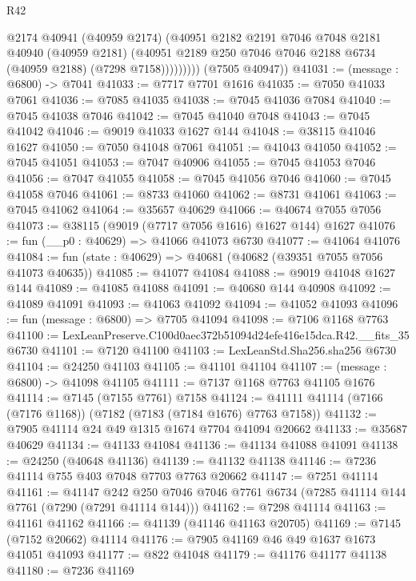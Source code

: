 \begin{lexlean}{R42}
\begin{coremodule}
{                  @2174
                  @40941
                  (@40959 @2174)
                  (@40951
                    @2182
                    @2191
                    @7046
                    @7048
                    @2181
                    @40940
                    (@40959 @2181)
                    (@40951 @2189 @250 @7046 @7046 @2188 @6734 (@40959 @2188) (@7298 @7158)))))))))
      (@7505 @40947))
@41031 := (message : @6800) -> @7041
@41033 := @7717 @7701 @1616
@41035 := @7050 @41033 @7061
@41036 := @7085 @41035
@41038 := @7045 @41036 @7084
@41040 := @7045 @41038 @7046
@41042 := @7045 @41040 @7048
@41043 := @7045 @41042
@41046 := @9019 @41033 @1627 @144
@41048 := @38115 @41046 @1627
@41050 := @7050 @41048 @7061
@41051 := @41043 @41050
@41052 := @7045 @41051
@41053 := @7047 @40906
@41055 := @7045 @41053 @7046
@41056 := @7047 @41055
@41058 := @7045 @41056 @7046
@41060 := @7045 @41058 @7046
@41061 := @8733 @41060
@41062 := @8731 @41061
@41063 := @7045 @41062
@41064 := @35657 @40629
@41066 := @40674 @7055 @7056
@41073 := @38115 (@9019 (@7717 @7056 @1616) @1627 @144) @1627
@41076 := fun (__p0 : @40629) => @41066 @41073 @6730
@41077 := @41064 @41076
@41084 := fun (state : @40629) => @40681 (@40682 (@39351 @7055 @7056 @41073 @40635))
@41085 := @41077 @41084
@41088 := @9019 @41048 @1627 @144
@41089 := @41085 @41088
@41091 := @40680 @144 @40908
@41092 := @41089 @41091
@41093 := @41063 @41092
@41094 := @41052 @41093
@41096 := fun (message : @6800) => @7705 @41094
@41098 := @7106 @1168 @7763
@41100 := LexLeanPreserve.C100d0aec372b51094d24efe416e15dca.R42.__fits_35 @6730
@41101 := @7120 @41100
@41103 := LexLeanStd.Sha256.sha256 @6730
@41104 := @24250 @41103
@41105 := @41101 @41104
@41107 := (message : @6800) -> @41098 @41105
@41111 := @7137 @1168 @7763 @41105 @1676
@41114 := @7145 (@7155 @7761) @7158
@41124 := @41111 @41114 (@7166 (@7176 @1168)) (@7182 (@7183 (@7184 @1676) @7763 @7158))
@41132 := @7905 @41114 @24 @49 @1315 @1674 @7704 @41094 @20662
@41133 := @35687 @40629
@41134 := @41133 @41084
@41136 := @41134 @41088 @41091
@41138 := @24250 (@40648 @41136)
@41139 := @41132 @41138
@41146 := @7236 @41114 @755 @403 @7048 @7703 @7763 @20662
@41147 := @7251 @41114
@41161 := @41147
    @242
    @250
    @7046
    @7046
    @7761
    @6734
    (@7285 @41114 @144 @7761 (@7290 (@7291 @41114 @144)))
@41162 := @7298 @41114
@41163 := @41161 @41162
@41166 := @41139 (@41146 @41163 @20705)
@41169 := @7145 (@7152 @20662) @41114
@41176 := @7905 @41169 @46 @49 @1637 @1673 @41051 @41093
@41177 := @822 @41048
@41179 := @41176 @41177 @41138
@41180 := @7236 @41169
}
\end{coremodule}
\end{lexlean}
